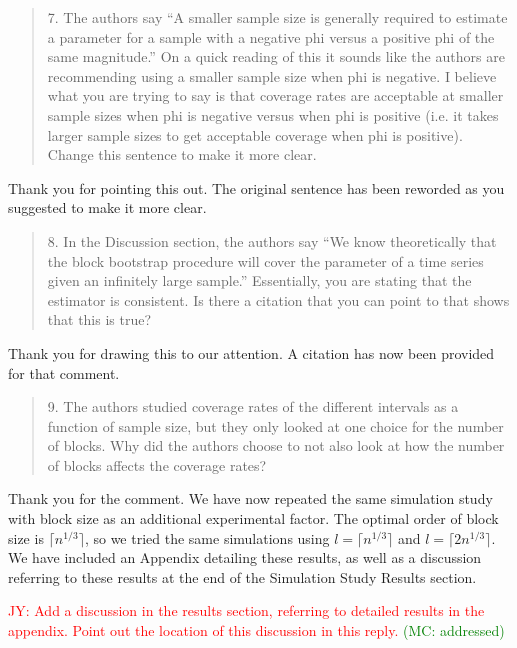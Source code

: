 \documentclass[12pt]{article}
\newcommand{\jy}[1]{\textcolor{red}{JY: #1}}
\newcommand{\mc}[1]{\textcolor{green}{(MC: #1)}}
\newenvironment{comment}%
{\begin{quotation}\noindent\small\it\color{darkblue}\ignorespaces%
}{\end{quotation}}
\begin{document}
\begin{comment}
7.  The authors say “A smaller sample size is generally required to estimate a 
parameter for a sample with a negative phi versus a positive phi of the same 
magnitude.”  On a quick reading of this it sounds like the authors are 
recommending using a smaller sample size when phi is negative.  I believe what 
you are trying to say is that coverage rates are acceptable at smaller sample 
sizes when phi is negative versus when phi is positive (i.e. it takes larger 
sample sizes to get acceptable coverage when phi is positive).  Change this 
sentence to make it more clear. 
\end{comment}

Thank you for pointing this out. The original sentence has been reworded as you
suggested to make it more clear.

\begin{comment}
8.   In the Discussion section, the authors say “We know theoretically that the 
block bootstrap procedure will cover the parameter of a time series given an 
infinitely large sample.”  Essentially, you are stating that the estimator is 
consistent.  Is there a citation that you can point to that shows that this is 
true? 
\end{comment}

Thank you for drawing this to our attention. A citation \citep{calhoun2018} has
now been provided for that comment.

\begin{comment}
9.   The authors studied coverage rates of the different intervals as a function 
of sample size, but they only looked at one choice for the number of blocks.  
Why did the authors choose to not also look at how the number of blocks affects 
the coverage rates?
\end{comment}

Thank you for the comment. We have now repeated the same simulation study with 
block size as an
additional experimental factor. The optimal order of block size is 
$\lceil n^{1/3} \rceil$, so we tried the same simulations using 
$l = \lceil n^{1/3} \rceil$ and $l = \lceil 2n^{1/3} \rceil$. We have included
an Appendix detailing these results, as well as a discussion referring to these
results at the end of the Simulation Study Results section.

\jy{Add a discussion in the results section, referring to detailed
  results in the appendix. Point out the location of this discussion
  in this reply.}
\mc{addressed}
\end{document}
